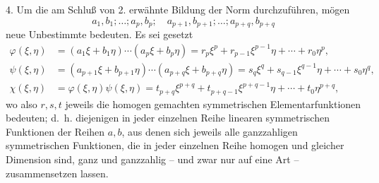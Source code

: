 4. Um die am Schluß von 2. erwähnte Bildung der Norm durchzuführen, mögen
\[
 a_1,b_1;\ldots; a_p,b_p;\quad a_{p+1},b_{p+1};\ldots; a_{p+q},b_{p+q}
\]
neue Unbestimmte bedeuten. Es sei gesetzt
\begin{equation}
\begin{aligned}
 \varphi(\xi,\eta)&=(a_1\xi+b_1\eta)\cdots(a_p\xi+b_p\eta)
     =r_p\xi^p+r_{p-1}\xi^{p-1}\eta+\cdots+r_0\eta^p,\\
 \psi(\xi,\eta)&=(a_{p+1}\xi+b_{p+1}\eta)\cdots(a_{p+q}\xi+b_{p+q}\eta)
     =s_q\xi^q+s_{q-1}\xi^{q-1}\eta+\cdots+s_0\eta^q,\\
 \chi(\xi,\eta)&=\varphi(\xi,\eta)\psi(\xi,\eta)
     =t_{p+q}\xi^{p+q}+t_{p+q-1}\xi^{p+q-1}\eta+\cdots+t_0\eta^{p+q},
\end{aligned}
\tag{8}
\end{equation}
wo also $r,s,t$ jeweils die homogen gemachten symmetrischen Elementarfunktionen bedeuten; d.~h. diejenigen in jeder einzelnen Reihe linearen symmetrischen Funktionen der Reihen $a,b$, aus denen sich jeweils alle ganzzahligen symmetrischen Funktionen, die in jeder einzelnen Reihe homogen und gleicher Dimension sind, ganz und ganzzahlig -- und zwar nur auf eine Art -- zusammensetzen lassen.

